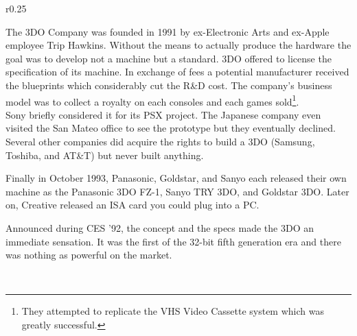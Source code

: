 \begin{wrapfigure}[14]{r}{0.25\textwidth}{
\centering {}}
\end{wrapfigure}
The 3DO Company was founded in 1991 by ex-Electronic Arts and ex-Apple employee Trip Hawkins. Without the means to actually produce the hardware the goal was to develop not a machine but a standard. 3DO offered to license the specification of its machine. In exchange of fees a potential manufacturer received the blueprints which considerably cut the R\&D cost. The company's business model was to collect a royalty on each consoles and each games sold\footnote{They attempted to replicate the VHS Video Cassette system which was greatly successful.}.\\

 Sony briefly considered it for its PSX project. The Japanese company even visited the San Mateo office to see the prototype but they eventually declined. Several other companies did acquire the rights to build a 3DO (Samsung, Toshiba, and AT\&T) but never built anything.\\
 \par
Finally in October 1993, Panasonic, Goldstar, and Sanyo each released their own machine as the Panasonic 3DO FZ-1, Sanyo TRY 3DO, and Goldstar 3DO. Later on, Creative released an ISA card you could plug into a PC.\\
\par
{}
\par
\vspace{-5pt}

















Announced during CES '92, the concept and the specs made the 3DO an immediate sensation. It was the first of the 32-bit fifth generation era and there was nothing as powerful on the market.\\
\par


\\

